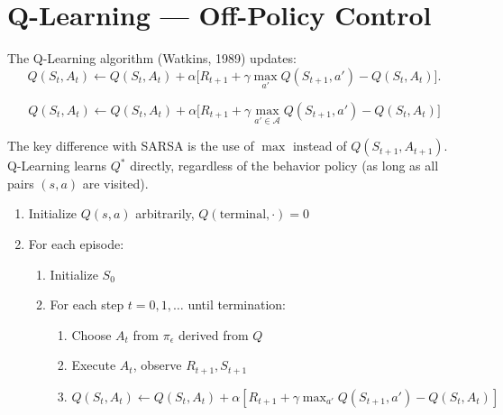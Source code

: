 \section{Q-Learning --- Off-Policy Control}
\label{sec:q_learning}

\begin{definition}[Q-Learning]
The Q-Learning algorithm (Watkins, 1989) updates:
\[
    Q(S_t, A_t) \leftarrow Q(S_t, A_t) + \alpha \big[
    R_{t+1} + \gamma \max_{a'} Q(S_{t+1}, a') - Q(S_t, A_t) \big].
\]
\end{definition}

\begin{keyformulas}[title=\textbf{Q-Learning Update}]
\[
    Q(S_t, A_t) \leftarrow Q(S_t, A_t) + \alpha \Big[
    R_{t+1} + \gamma \max_{a' \in \mathcal{A}} Q(S_{t+1}, a') - Q(S_t, A_t) \Big]
\]
\end{keyformulas}

The key difference with SARSA is the use of $\max$ instead of
$Q(S_{t+1}, A_{t+1})$. Q-Learning learns $Q^*$ directly, regardless of
the behavior policy (as long as all pairs $(s,a)$ are visited).

\begin{algorithme}[title=\textbf{Q-Learning}]
\begin{enumerate}
    \item Initialize $Q(s,a)$ arbitrarily, $Q(\text{terminal}, \cdot) = 0$
    \item For each episode:
    \begin{enumerate}
        \item Initialize $S_0$
        \item For each step $t = 0, 1, \ldots$ until termination:
        \begin{enumerate}
            \item Choose $A_t$ from $\pi_\epsilon$ derived from $Q$
            \item Execute $A_t$, observe $R_{t+1}, S_{t+1}$
            \item $Q(S_t, A_t) \leftarrow Q(S_t, A_t) + \alpha[R_{t+1} + \gamma \max_{a'} Q(S_{t+1}, a') - Q(S_t, A_t)]$
        \end{enumerate}
    \end{enumerate}
\end{enumerate}
\end{algorithme}

